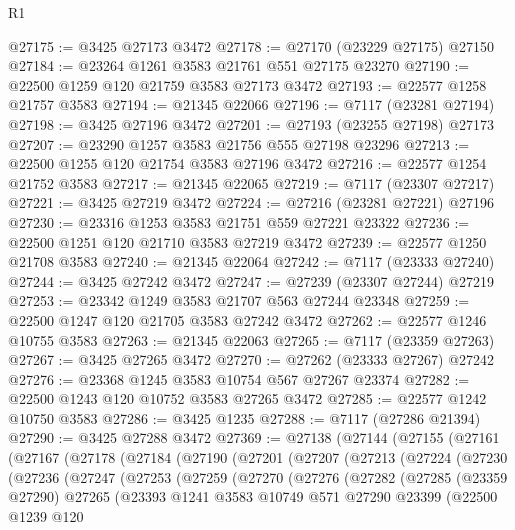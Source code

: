\begin{lexlean}{R1}
\begin{coremodule}
@27175 := @3425 @27173 @3472
@27178 := @27170 (@23229 @27175) @27150
@27184 := @23264 @1261 @3583 @21761 @551 @27175 @23270
@27190 := @22500 @1259 @120 @21759 @3583 @27173 @3472
@27193 := @22577 @1258 @21757 @3583
@27194 := @21345 @22066
@27196 := @7117 (@23281 @27194)
@27198 := @3425 @27196 @3472
@27201 := @27193 (@23255 @27198) @27173
@27207 := @23290 @1257 @3583 @21756 @555 @27198 @23296
@27213 := @22500 @1255 @120 @21754 @3583 @27196 @3472
@27216 := @22577 @1254 @21752 @3583
@27217 := @21345 @22065
@27219 := @7117 (@23307 @27217)
@27221 := @3425 @27219 @3472
@27224 := @27216 (@23281 @27221) @27196
@27230 := @23316 @1253 @3583 @21751 @559 @27221 @23322
@27236 := @22500 @1251 @120 @21710 @3583 @27219 @3472
@27239 := @22577 @1250 @21708 @3583
@27240 := @21345 @22064
@27242 := @7117 (@23333 @27240)
@27244 := @3425 @27242 @3472
@27247 := @27239 (@23307 @27244) @27219
@27253 := @23342 @1249 @3583 @21707 @563 @27244 @23348
@27259 := @22500 @1247 @120 @21705 @3583 @27242 @3472
@27262 := @22577 @1246 @10755 @3583
@27263 := @21345 @22063
@27265 := @7117 (@23359 @27263)
@27267 := @3425 @27265 @3472
@27270 := @27262 (@23333 @27267) @27242
@27276 := @23368 @1245 @3583 @10754 @567 @27267 @23374
@27282 := @22500 @1243 @120 @10752 @3583 @27265 @3472
@27285 := @22577 @1242 @10750 @3583
@27286 := @3425 @1235
@27288 := @7117 (@27286 @21394)
@27290 := @3425 @27288 @3472
@27369 := @27138
    (@27144
      (@27155
        (@27161
          (@27167
            (@27178
              (@27184
                (@27190
                  (@27201
                    (@27207
                      (@27213
                        (@27224
                          (@27230
                            (@27236
                              (@27247
                                (@27253
                                  (@27259
                                    (@27270
                                      (@27276
                                        (@27282
                                          (@27285
                                            (@23359 @27290)
                                            @27265
                                            (@23393
                                              @1241
                                              @3583
                                              @10749
                                              @571
                                              @27290
                                              @23399
                                              (@22500
                                                @1239
                                                @120

\end{coremodule}
\end{lexlean}
